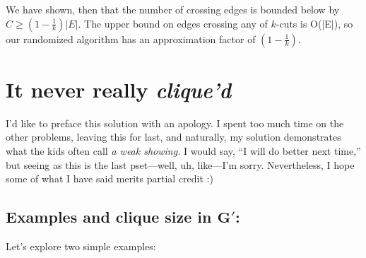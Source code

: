 \documentclass[conference]{styles/acmsiggraph}
\newcommand{\?}{\stackrel{?}{=}}
\DeclareRobustCommand{\mybox}[2][gray!20]{%
\begin{tcolorbox}[   %
        breakable,
        left=0pt,
        right=0pt,
        top=0pt,
        bottom=0pt,
        colback=#1,
        colframe=#1,
        width=\dimexpr\textwidth\relax, 
        enlarge left by=0mm,
        boxsep=5pt,
        arc=0pt,outer arc=0pt,
        ]
        #2
\end{tcolorbox}
}
\begin{document}
\mybox{
We have shown, then that the number of crossing edges is bounded below by $C \geq \left(1 - \frac{1}{k}\right) |E|$.  The upper bound on edges crossing any of $k$-cuts is O(|E|), so our randomized algorithm has an approximation factor of $\left (1 - \frac{1}{k}\right)$.
}

\newpage


\section{It never really \textit{clique'd}}
I'd like to preface this solution with an apology.  I spent too much time on the other problems, leaving this for last, and naturally, my solution demonstrates what the kids often call \textit{a weak showing.}  I would say, \enquote{I will do better next time,} but seeing as this is the last pset---well, uh, like---I'm sorry.  Nevertheless, I hope some of what I have said merits partial credit :)

\subsection{Examples and clique size in $\mathbf{G'}$:}
Let's explore two simple examples:
\end{document}
